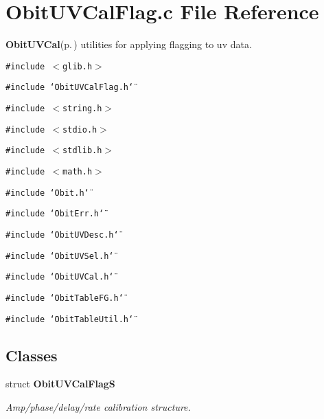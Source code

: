 \section{Obit\-UVCal\-Flag.c File Reference}
\label{ObitUVCalFlag_8c}
{\bf Obit\-UVCal}{\rm (p.\,\pageref{structObitUVCal})} utilities for applying flagging to uv data. 

{\tt \#include $<$glib.h$>$}\par
{\tt \#include \char`\"{}Obit\-UVCal\-Flag.h\char`\"{}}\par
{\tt \#include $<$string.h$>$}\par
{\tt \#include $<$stdio.h$>$}\par
{\tt \#include $<$stdlib.h$>$}\par
{\tt \#include $<$math.h$>$}\par
{\tt \#include \char`\"{}Obit.h\char`\"{}}\par
{\tt \#include \char`\"{}Obit\-Err.h\char`\"{}}\par
{\tt \#include \char`\"{}Obit\-UVDesc.h\char`\"{}}\par
{\tt \#include \char`\"{}Obit\-UVSel.h\char`\"{}}\par
{\tt \#include \char`\"{}Obit\-UVCal.h\char`\"{}}\par
{\tt \#include \char`\"{}Obit\-Table\-FG.h\char`\"{}}\par
{\tt \#include \char`\"{}Obit\-Table\-Util.h\char`\"{}}\par
\subsection*{Classes}
\begin{CompactItemize}
\item 
struct {\bf Obit\-UVCal\-Flag\-S}
\begin{CompactList}\small\item\em Amp/phase/delay/rate calibration structure. \item\end{CompactList}\end{CompactItemize}
